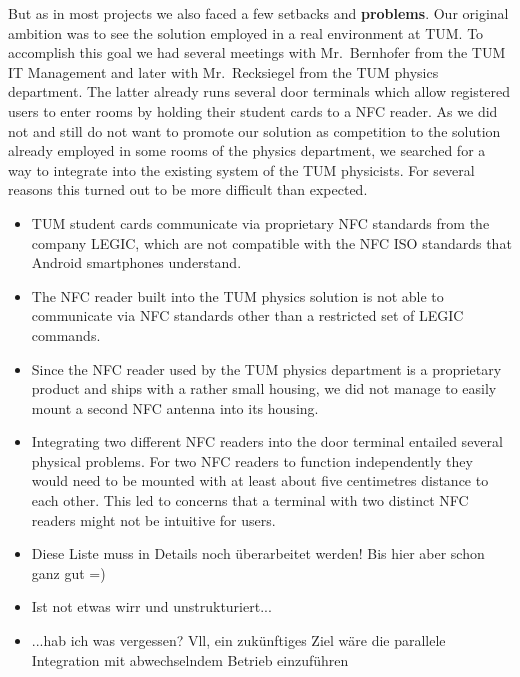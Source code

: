But as in most projects we also faced a few setbacks and \textbf{problems}.
Our original ambition was to see the \app solution employed in a real environment at TUM.
To accomplish this goal we had several meetings with Mr.~Bernhofer from the TUM IT Management and later with Mr.~Recksiegel from the TUM physics department.
The latter already runs several door terminals which allow registered users to enter rooms by holding their student cards to a NFC reader.
As we did not and still do not want to promote our solution as competition to the solution already employed in some rooms of the physics department, we searched for a way to integrate \app into the existing system of the TUM physicists.
For several reasons this turned out to be more difficult than expected.
\begin{itemize}
\item TUM student cards communicate via proprietary NFC standards from the company LEGIC, which are not compatible with the NFC ISO standards that Android smartphones understand.
\item The NFC reader built into the TUM physics solution is not able to communicate via NFC standards other than a restricted set of LEGIC commands.
\item Since the NFC reader used by the TUM physics department is a proprietary product and ships with a rather small housing, we did not manage to easily mount a second NFC antenna into its housing.
\item Integrating two different NFC readers into the door terminal entailed several physical problems.
For two NFC readers to function independently they would need to be mounted with at least about five centimetres distance to each other.
This led to concerns that a terminal with two distinct NFC readers might not be intuitive for users.
\item Diese Liste muss in Details noch überarbeitet werden! Bis hier aber schon ganz gut =)\todo{!!!}
\item Ist not etwas wirr und unstrukturiert...
\item ...hab ich was vergessen? Vll, ein zukünftiges Ziel wäre die parallele Integration mit abwechselndem Betrieb einzuführen
\end{itemize}


\iffalse

:\todo{TODO}
hatten wir ja ein paar: Zusammenspiel mit anderen Lesegeräten (Legic), ...
-> dadurch: unwahrscheinlicher, dass die Lösung in der Praxis eingesetzt werden wird.

any problems? Differences to the planned functionality?

Differences to the planned functionality:
gibt's bei uns eher nicht, oder?

Stefan: Ne, eigentlich sogar noch mehr Funktionalität und erhöhte Sicherheit/Anonymität als spezifiziert.
\fi